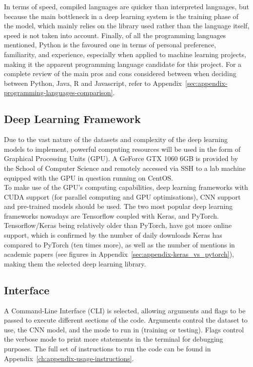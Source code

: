 In terms of speed, compiled languages are quicker than interpreted languages, but because the main bottleneck in a deep learning system is the training phase of the model, which mainly relies on the library used rather than the language itself, speed is not taken into account. Finally, of all the programming languages mentioned, Python is the favoured one in terms of personal preference, familiarity, and experience, especially when applied to machine learning projects, making it the apparent programming language candidate for this project. For a complete review of the main pros and cons considered between when deciding between Python, Java, R and Javascript, refer to Appendix~\ref{sec:appendix-programming-languages-comparison}.

\subsection{Deep Learning Framework}

Due to the vast nature of the datasets and complexity of the deep learning models to implement, powerful computing resources will be used in the form of Graphical Processing Units (GPU). A GeForce GTX 1060 6GB is provided by the School of Computer Science and remotely accessed via SSH to a lab machine equipped with the GPU in question running on CentOS.\\

To make use of the GPU's computing capabilities, deep learning frameworks with CUDA support (for parallel computing and GPU optimisations), CNN support and pre-trained models should be used. The two most popular deep learning frameworks nowadays are Tensorflow coupled with Keras, and PyTorch. Tensorflow/Keras being relatively older than PyTorch, have got more online support, which is confirmed by the number of daily downloads Keras has compared to PyTorch (ten times more), as well as the number of mentions in academic papers (see figures  in Appendix~\ref{sec:appendix-keras_vs_pytorch}), making them the selected deep learning library.

\subsection{Interface}

A Command-Line Interface (CLI) is selected, allowing arguments and flags to be passed to execute different sections of the code. Arguments control the dataset to use, the CNN model, and the mode to run in (training or testing). Flags control the verbose mode to print more statements in the terminal for debugging purposes. The full set of instructions to run the code can be found in Appendix~\ref{ch:appendix-usage-instructions}.

